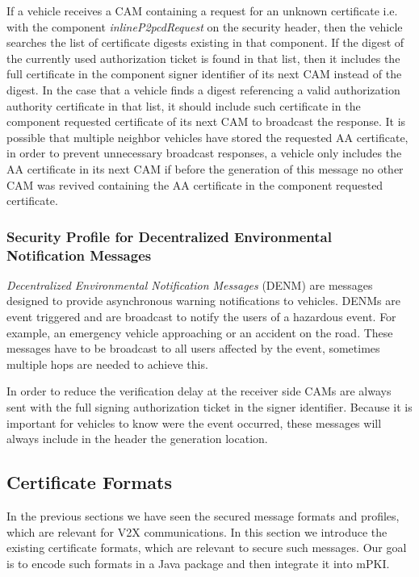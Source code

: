 If a vehicle receives a CAM containing a request for an unknown certificate i.e. with the component \textit{inlineP2pcdRequest} on the security header, then the vehicle searches the list of certificate digests existing in that component. If the digest of the currently used authorization ticket is found in that list, then it includes the full certificate in the component signer identifier of its next CAM instead of the digest. In the case that a vehicle finds a digest referencing a valid authorization authority certificate in that list, it should include such certificate in the component requested certificate of its next CAM to broadcast the response. It is possible that multiple neighbor vehicles have stored the requested AA certificate, in order to prevent unnecessary broadcast responses, a vehicle only includes the AA certificate in its next CAM if before the generation of this message no other CAM was revived containing the AA certificate in the component requested certificate.


\subsubsection{Security Profile for Decentralized Environmental Notification Messages} 
\textit{Decentralized Environmental Notification Messages} (DENM) are messages designed to provide asynchronous warning notifications to vehicles. DENMs are event triggered and are broadcast to notify the users of a hazardous event. For example, an emergency vehicle approaching or an accident on the road. These messages have to be broadcast to all users affected by the event, sometimes multiple hops are needed to achieve this.

In order to reduce the verification delay at the receiver side CAMs are always sent with the full signing authorization ticket in the signer identifier. Because it is important for vehicles to know were the event occurred, these messages will always include in the header the generation location.

\subsection{Certificate Formats}\label{cert_formats}
In the previous sections we have seen the secured message formats and profiles, which are relevant for V2X communications. In this section we introduce the existing certificate formats, which are relevant to secure such messages. Our goal is to encode such formats in a Java package and then integrate it into mPKI.


